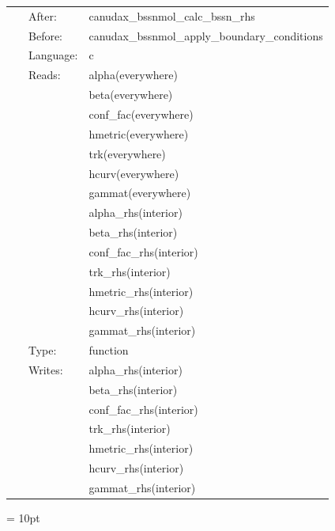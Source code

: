  \begin{tabular*}{160mm}{cll} 
~ & After:  & canudax\_bssnmol\_calc\_bssn\_rhs \\ 
~ & Before:  & canudax\_bssnmol\_apply\_boundary\_conditions \\ 
~ & Language:  & c \\ 
~ & Reads:  & alpha(everywhere) \\ 
~& ~ &beta(everywhere)\\ 
~& ~ &conf\_fac(everywhere)\\ 
~& ~ &hmetric(everywhere)\\ 
~& ~ &trk(everywhere)\\ 
~& ~ &hcurv(everywhere)\\ 
~& ~ &gammat(everywhere)\\ 
~& ~ &alpha\_rhs(interior)\\ 
~& ~ &beta\_rhs(interior)\\ 
~& ~ &conf\_fac\_rhs(interior)\\ 
~& ~ &trk\_rhs(interior)\\ 
~& ~ &hmetric\_rhs(interior)\\ 
~& ~ &hcurv\_rhs(interior)\\ 
~& ~ &gammat\_rhs(interior)\\ 
~ & Type:  & function \\ 
~ & Writes:  & alpha\_rhs(interior) \\ 
~& ~ &beta\_rhs(interior)\\ 
~& ~ &conf\_fac\_rhs(interior)\\ 
~& ~ &trk\_rhs(interior)\\ 
~& ~ &hmetric\_rhs(interior)\\ 
~& ~ &hcurv\_rhs(interior)\\ 
~& ~ &gammat\_rhs(interior)\\ 
\end{tabular*} 



\vspace{5mm}\parskip = 10pt 
